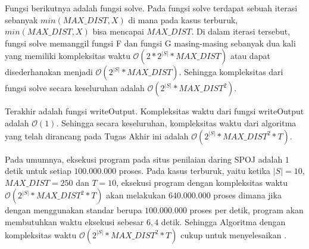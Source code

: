 Fungsi berikutnya adalah fungsi solve. Pada fungsi solve terdapat sebuah iterasi sebanyak $ min(MAX\_DIST, X) $ di mana pada kasus terburuk, $ min(MAX\_DIST, X) $ bisa mencapai $ MAX\_DIST $. Di dalam iterasi tersebut, fungsi solve memanggil fungsi F dan fungsi G masing-masing sebanyak dua kali yang memiliki kompleksitas waktu $ \mathcal{O}(2 * 2^{|S|} * MAX\_DIST) $ atau dapat disederhanakan menjadi $ \mathcal{O}(2^{|S|} * MAX\_DIST) $. Sehingga kompleksitas dari fungsi solve secara keseluruhan adalah $ \mathcal{O}(2^{|S|} * MAX\_DIST^{2}) $.

Terakhir adalah fungsi writeOutput. Kompleksitas waktu dari fungsi writeOutput adalah $ \mathcal{O}(1) $. Sehingga secara keseluruhan, kompleksitas waktu dari algoritma yang telah dirancang pada Tugas Akhir ini adalah $ \mathcal{O}(2^{|S|} * MAX\_DIST^{2} * T) $.

Pada umumnya, eksekusi program pada situs penilaian daring SPOJ adalah $ 1 $ detik untuk setiap $ 100.000.000 $ proses. Pada kasus terburuk, yaitu ketika $ |S|=10 $, $ MAX\_DIST=250 $ dan $ T=10 $, eksekusi program dengan kompleksitas waktu $ \mathcal{O}(2^{|S|} * MAX\_DIST^{2} * T) $ akan melakukan $ 640.000.000 $ proses dimana jika dengan menggunakan standar berupa $ 100.000.000 $ proses per detik, program akan membutuhkan waktu eksekusi sebesar $ 6,4 $ detik. Sehingga Algoritma dengan kompleksitas waktu $ \mathcal{O}(2^{|S|} * MAX\_DIST^{2} * T) $ cukup untuk menyelesaikan \problem{}.